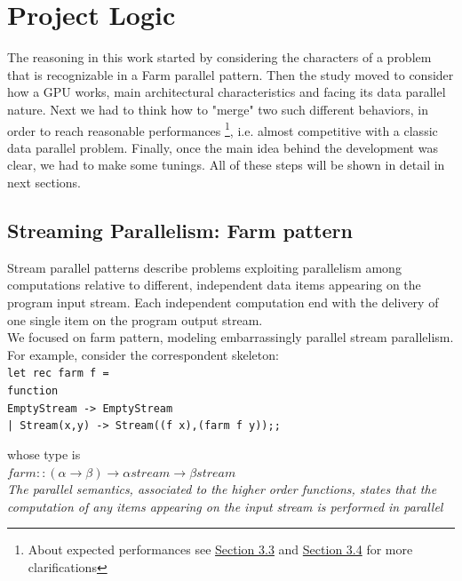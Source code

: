 \chapter{Project Logic}
\label{chap:logic}

The reasoning in this work started by considering the characters of a problem that is recognizable in a Farm parallel pattern.
Then the study moved to consider how a GPU works, main architectural characteristics and facing its data parallel nature.
Next we had to think how to "merge" two such different behaviors, in order to reach reasonable performances \footnote{About expected performances see \hyperref[sect:overallLogic]{Section 3.3} and \hyperref[sect:tunings]{Section 3.4} for more clarifications}, i.e. almost competitive with a classic data parallel problem.
Finally, once the main idea behind the development was clear, we had to make some tunings.
All of these steps will be shown in detail in next sections.

\section{Streaming Parallelism: Farm pattern}
Stream parallel patterns describe problems exploiting parallelism among computations relative to
different, independent data items appearing on the program input stream.
Each independent computation end with the delivery of one single item on the program output stream.\\
We focused on farm pattern, modeling embarrassingly parallel stream parallelism. 
For example, consider the correspondent skeleton:\\
\texttt{let rec farm f =\\
	function\\
	EmptyStream -> EmptyStream\\
	| Stream(x,y) -> Stream((f x),(farm f y));;\\
	}
	
whose type is\\
\( farm :: (\alpha \rightarrow \beta) \rightarrow \alpha stream \rightarrow \beta stream \)\\

\textit{The parallel semantics, associated to the higher order functions, states that the computation of any items appearing on the input stream is performed in parallel}\\

